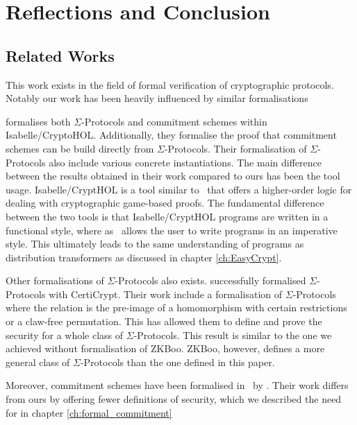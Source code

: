 \chapter{Reflections and Conclusion}
\label{sec:reflection_conclusion}

\section{Related Works}
\label{sec:related_works}
This work exists in the field of formal verification of cryptographic protocols.
Notably our work has been heavily influenced by similar formalisations
\cite{cryptoeprint:2019:1185,DBLP:journals/corr/MetereD17,certicrypt_sigma,zkcrypt,Yao}

\citet{cryptoeprint:2019:1185} formalises both $\Sigma$-Protocols and
commitment schemes within Isabelle/CryptoHOL. Additionally, they formalise
the proof that commitment schemes can be build directly from $\Sigma$-Protocols.
Their formalisation of $\Sigma$-Protocols also include various concrete instantiations.
The main difference between the results obtained in their work compared to ours
has been the tool usage. Isabelle/CryptHOL is a tool similar to \easycrypt\ that
offers a higher-order logic for dealing with cryptographic game-based proofs.
The fundamental difference between the two tools is that Isabelle/CryptHOL
programs are written in a functional style, where as \easycrypt\ allows the user
to write programs in an imperative style. This ultimately leads to the same
understanding of programs as distribution transformers as discussed in chapter
\ref{ch:EasyCrypt}.

Other formalisations of $\Sigma$-Protocols also exists. \citet{certicrypt_sigma}
successfully formalised $\Sigma$-Protocols with CertiCrypt. Their work include a
formalisation of $\Sigma$-Protocols where the relation is the pre-image of a
homomorphism with certain restrictions or a claw-free permutation. This has
allowed them to define and prove the security for a whole class of
$\Sigma$-Protocols. This result is similar to the one we achieved without
formalisation of ZKBoo. ZKBoo, however, defines a more general class of
$\Sigma$-Protocols than the one defined in this paper.

Moreover, commitment schemes have been formalised in \easycrypt\ by
\citet{DBLP:journals/corr/MetereD17}. Their work differs from ours by offering
fewer definitions of security, which we described the need for in chapter \ref{ch:formal_commitment}

